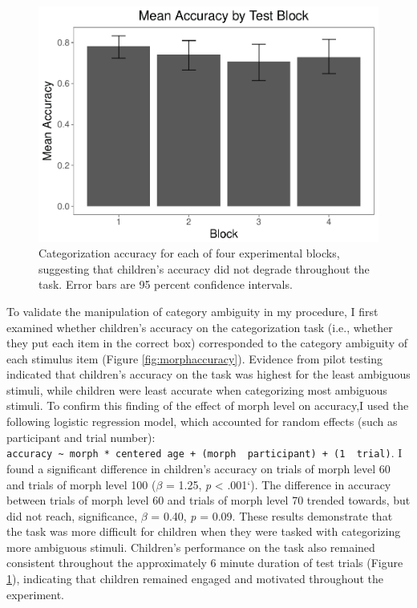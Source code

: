 \documentclass[floatsintext,man]{apa6}
\theoremstyle{definition}
\theoremstyle{definition}
\theoremstyle{definition}
\theoremstyle{remark}
\begin{document}
\begin{figure}
\centering
\includegraphics{soc_ref_category_paper_files/figure-latex/blockaccuracy-1.pdf}
\caption{\label{fig:blockaccuracy}Categorization accuracy for each of four
experimental blocks, suggesting that children's accuracy did not degrade
throughout the task. Error bars are 95 percent confidence intervals.}
\end{figure}

To validate the manipulation of category ambiguity in my procedure, I
first examined whether children's accuracy on the categorization task
(i.e., whether they put each item in the correct box) corresponded to
the category ambiguity of each stimulus item (Figure
\ref{fig:morphaccuracy}). Evidence from pilot testing indicated that
children's accuracy on the task was highest for the least ambiguous
stimuli, while children were least accurate when categorizing most
ambiguous stimuli. To confirm this finding of the effect of morph level
on accuracy,I used the following logistic regression model, which
accounted for random effects (such as participant and trial number):
\texttt{accuracy\ \textasciitilde{}\ morph\ *\ centered\ age\ +\ (morph\ \textbar{}\ participant)\ +\ (1\ \textbar{}\ trial)}.
I found a significant difference in children's accuracy on trials of
morph level 60 and trials of morph level 100 (\(\beta\) = 1.25, \emph{p}
\textless{} .001`). The difference in accuracy between trials of morph
level 60 and trials of morph level 70 trended towards, but did not
reach, significance, \(\beta\) = 0.40, \emph{p} = 0.09. These results
demonstrate that the task was more difficult for children when they were
tasked with categorizing more ambiguous stimuli. Children's performance
on the task also remained consistent throughout the approximately 6
minute duration of test trials (Figure \ref{fig:blockaccuracy}),
indicating that children remained engaged and motivated throughout the
experiment.
\end{document}
